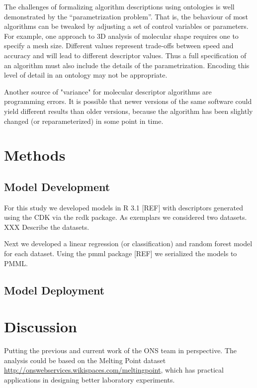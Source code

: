 \documentclass[12pt,letterpaper]{article}
\begin{document}
The challenges of formalizing algorithm descriptions using ontologies
is well demonstrated by the ``parametrization problem''.  That is, the
behaviour of most algorithms can be tweaked by adjusting a set of
control variables or parameters. For example, one approach to 3D
analysis of molecular shape requires one to specify a mesh
size. Different values represent trade-offs between speed and accuracy
and will lead to different descriptor values. Thus a full
specification of an algorithm must also include the details of the
parametrization. Encoding this level of detail in an ontology may not
be appropriate.

Another source of "variance" for molecular descriptor
algorithms are programming errors. It is possible that newer versions
of the same software could yield different results than older
versions, because the algorithm has been slightly changed (or
reparameterized) in some point in time.

\section{Methods}
\label{sec:methods}

\subsection{Model Development}
\label{sec:model-development}

For this study we developed models in R 3.1 [REF] with descriptors
generated using the CDK \cite{Steinbeck:2003bh} via the rcdk
\cite{Guha:2007aa} package. As exemplars we considered two
datasets. XXX Describe the datasets.

Next we developed a linear regression (or classification) and random
forest  model  for each dataset. Using the pmml package [REF] we
serialized the models to PMML.

\subsection{Model Deployment}
\label{sec:model-deployment}

\section{Discussion}
\label{sec:discussion}

Putting the previous and current work of the ONS team in perspective.
The analysis could be based on the Melting Point dataset \url{http://onswebservices.wikispaces.com/meltingpoint}, which has practical 
applications in designing better laboratory experiments.
\end{document}
